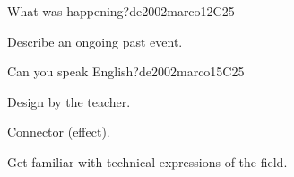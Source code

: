 \begin{syllabus}
\begin{unit}{What was happening?}{}{de2002marco}{12}{C25}
   \begin{learningoutcomes}
      \item Describe an ongoing past event.
   \end{learningoutcomes}
\end{unit}

\begin{unit}{Can you speak English?}{}{de2002marco}{15}{C25}
   \begin{topics}
      \item Design by the teacher.
      \item Connector (effect).
   \end{topics}

   \begin{learningoutcomes}
      \item Get familiar with technical expressions of the field.
   \end{learningoutcomes}
\end{unit}

\begin{coursebibliography}
\end{coursebibliography}

\end{syllabus}
%
